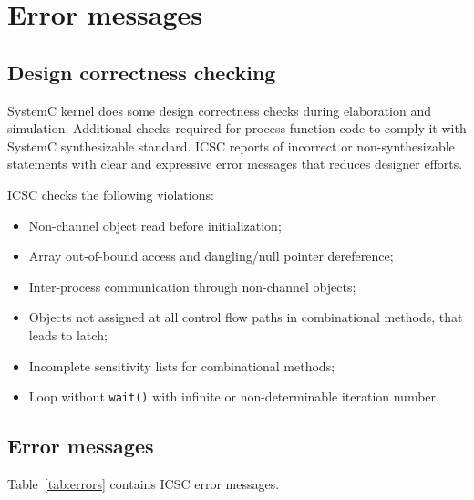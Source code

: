 \section{Error messages}\label{section:errors}


\subsection{Design correctness checking}

SystemC kernel does some design correctness checks during elaboration and simulation. Additional checks required for process function code to comply it with SystemC synthesizable standard. ICSC reports of incorrect or non-synthesizable statements with clear and expressive error messages that reduces designer efforts.

ICSC checks the following violations:
%
\begin{itemize}
\item Non-channel object read before initialization;
\item Array out-of-bound access and dangling/null pointer dereference;
\item Inter-process communication through non-channel objects;
\item Objects not assigned at all control flow paths in combinational methods, that leads to latch;
\item Incomplete sensitivity lists for combinational methods;
\item Loop without {\tt wait()} with infinite or non-determinable iteration number.
\end{itemize}



\subsection{Error messages}\label{section:error_msg}

Table~\ref{tab:errors} contains ICSC error messages.

